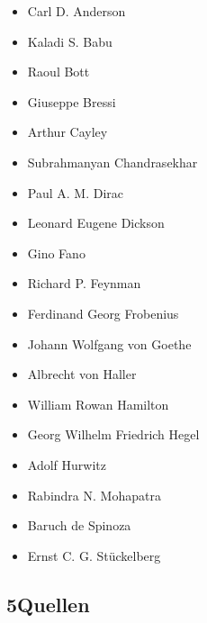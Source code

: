 \documentclass[11pt,a4paper]{article}
\begin{document}
\begin{itemize}[leftmargin=1.2em,itemsep=0pt]
\item Carl D. Anderson
\item Kaladi S. Babu
\item Raoul Bott
\item Giuseppe Bressi
\item Arthur Cayley
\item Subrahmanyan Chandrasekhar
\item Paul A. M. Dirac
\item Leonard Eugene Dickson
\item Gino Fano
\item Richard P. Feynman
\item Ferdinand Georg Frobenius
\item Johann Wolfgang von Goethe
\item Albrecht von Haller
\item William Rowan Hamilton
\item Georg Wilhelm Friedrich Hegel
\item Adolf Hurwitz
\item Rabindra N. Mohapatra
\item Baruch de Spinoza
\item Ernst C. G. Stückelberg
\end{itemize}

\subsection*{5\quad Quellen}
\end{document}
